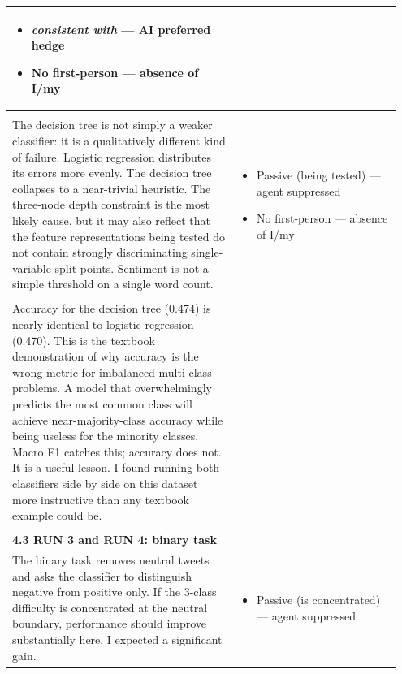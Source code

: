 \documentclass[11pt]{article}
\begin{document}
\begin{longtable}{|p{0.55\linewidth}|p{0.40\linewidth}|}
\begin{itemize}[leftmargin=1em,itemsep=1pt,topsep=1pt,parsep=0pt]
  \item \textit{consistent with} --- AI preferred hedge
  \item No first-person --- absence of I/my
\end{itemize} \\[2pt]
\hline
\rule{0pt}{3.5cm} & \\
\hline
The decision tree is not simply a weaker classifier: it is a qualitatively different kind of failure. Logistic regression distributes its errors more evenly. The decision tree collapses to a near-trivial heuristic. The three-node depth constraint is the most likely cause, but it may also reflect that the feature representations being tested do not contain strongly discriminating single-variable split points. Sentiment is not a simple threshold on a single word count. & \begin{itemize}[leftmargin=1em,itemsep=1pt,topsep=1pt,parsep=0pt]
  \item Passive (being tested) --- agent suppressed
  \item No first-person --- absence of I/my
\end{itemize} \\[2pt]
\hline
\rule{0pt}{3.5cm} & \\
\hline
Accuracy for the decision tree (0.474) is nearly identical to logistic regression (0.470). This is the textbook demonstration of why accuracy is the wrong metric for imbalanced multi-class problems. A model that overwhelmingly predicts the most common class will achieve near-majority-class accuracy while being useless for the minority classes. Macro F1 catches this; accuracy does not. It is a useful lesson. I found running both classifiers side by side on this dataset more instructive than any textbook example could be. &  \\[2pt]
\hline
\rule{0pt}{3.5cm} & \\
\hline
\textbf{4.3 RUN 3 and RUN 4: binary task}\\[4pt]
The binary task removes neutral tweets and asks the classifier to distinguish negative from positive only. If the 3-class difficulty is concentrated at the neutral boundary, performance should improve substantially here. I expected a significant gain. & \begin{itemize}[leftmargin=1em,itemsep=1pt,topsep=1pt,parsep=0pt]
  \item Passive (is concentrated) --- agent suppressed
\end{itemize} \\[2pt]
\hline

\end{longtable}
\end{document}
